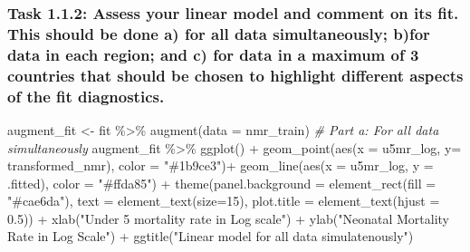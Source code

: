 \documentclass[
]{article}
\newenvironment{Shaded}{\begin{snugshade}}{\end{snugshade}}
\newcommand{\AttributeTok}[1]{\textcolor[rgb]{0.77,0.63,0.00}{#1}}
\newcommand{\CommentTok}[1]{\textcolor[rgb]{0.56,0.35,0.01}{\textit{#1}}}
\newcommand{\DecValTok}[1]{\textcolor[rgb]{0.00,0.00,0.81}{#1}}
\newcommand{\FloatTok}[1]{\textcolor[rgb]{0.00,0.00,0.81}{#1}}
\newcommand{\FunctionTok}[1]{\textcolor[rgb]{0.00,0.00,0.00}{#1}}
\newcommand{\NormalTok}[1]{#1}
\newcommand{\OtherTok}[1]{\textcolor[rgb]{0.56,0.35,0.01}{#1}}
\newcommand{\SpecialCharTok}[1]{\textcolor[rgb]{0.00,0.00,0.00}{#1}}
\newcommand{\StringTok}[1]{\textcolor[rgb]{0.31,0.60,0.02}{#1}}
\begin{document}
\hypertarget{task-1.1.2-assess-your-linear-model-and-comment-on-its-fit.-this-should-be-done-a-for-all-data-simultaneously-bfor-data-in-each-region-and-c-for-data-in-a-maximum-of-3-countries-that-should-be-chosen-to-highlight-different-aspects-of-the-fit-diagnostics.}{%
\subsubsection{Task 1.1.2: Assess your linear model and comment on its
fit. This should be done a) for all data simultaneously; b)for data in
each region; and c) for data in a maximum of 3 countries that should be
chosen to highlight different aspects of the fit
diagnostics.}\label{task-1.1.2-assess-your-linear-model-and-comment-on-its-fit.-this-should-be-done-a-for-all-data-simultaneously-bfor-data-in-each-region-and-c-for-data-in-a-maximum-of-3-countries-that-should-be-chosen-to-highlight-different-aspects-of-the-fit-diagnostics.}}

\begin{Shaded}
\begin{Highlighting}[]
\NormalTok{augment\_fit }\OtherTok{\textless{}{-}}\NormalTok{ fit }\SpecialCharTok{\%\textgreater{}\%} 
  \FunctionTok{augment}\NormalTok{(}\AttributeTok{data =}\NormalTok{ nmr\_train)}
\CommentTok{\# Part a: For all data simultaneously}
\NormalTok{augment\_fit }\SpecialCharTok{\%\textgreater{}\%} 
  \FunctionTok{ggplot}\NormalTok{() }\SpecialCharTok{+}
  \FunctionTok{geom\_point}\NormalTok{(}\FunctionTok{aes}\NormalTok{(}\AttributeTok{x =}\NormalTok{ u5mr\_log, }\AttributeTok{y=}\NormalTok{ transformed\_nmr), }\AttributeTok{color =} \StringTok{"\#1b9ce3"}\NormalTok{)}\SpecialCharTok{+}
  \FunctionTok{geom\_line}\NormalTok{(}\FunctionTok{aes}\NormalTok{(}\AttributeTok{x =}\NormalTok{ u5mr\_log, }\AttributeTok{y =}\NormalTok{ .fitted), }\AttributeTok{color =} \StringTok{"\#ffda85"}\NormalTok{) }\SpecialCharTok{+}
  \FunctionTok{theme}\NormalTok{(}\AttributeTok{panel.background =} \FunctionTok{element\_rect}\NormalTok{(}\AttributeTok{fill =} \StringTok{"\#cae6da"}\NormalTok{), }\AttributeTok{text =} \FunctionTok{element\_text}\NormalTok{(}\AttributeTok{size=}\DecValTok{15}\NormalTok{),}
        \AttributeTok{plot.title =} \FunctionTok{element\_text}\NormalTok{(}\AttributeTok{hjust =} \FloatTok{0.5}\NormalTok{)) }\SpecialCharTok{+}
  \FunctionTok{xlab}\NormalTok{(}\StringTok{"Under 5 mortality rate in Log scale"}\NormalTok{) }\SpecialCharTok{+}
  \FunctionTok{ylab}\NormalTok{(}\StringTok{"Neonatal Mortality Rate in Log Scale"}\NormalTok{) }\SpecialCharTok{+}
  \FunctionTok{ggtitle}\NormalTok{(}\StringTok{"Linear model for all data simulatenously"}\NormalTok{)}
\end{Highlighting}
\end{Shaded}
\end{document}
